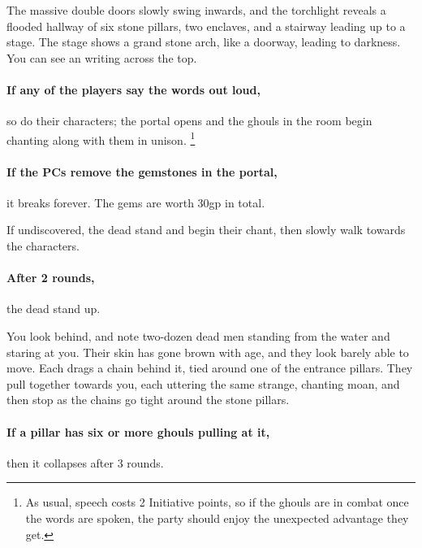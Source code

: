 \begin{multicols}{2}
\begin{boxtext}

  The massive double doors slowly swing inwards, and the torchlight reveals a flooded hallway of six stone pillars, two enclaves, and a stairway leading up to a stage.
  The stage shows a grand stone arch, like a doorway, leading to darkness.
  You can see an writing across the top.

\end{boxtext}

\paragraph{If any of the players say the words out loud,}
so do their characters; the portal opens and the ghouls in the room begin chanting along with them in unison.%
\footnote{As usual, speech costs 2 Initiative points, so if the ghouls are in combat once the words are spoken, the party should enjoy the unexpected advantage they get.}

\paragraph{If the PCs remove the gemstones in the portal,}
it breaks forever.
The gems are worth 30gp in total.

If undiscovered, the dead stand and begin their chant, then slowly walk towards the characters.

\paragraph{After 2 rounds,}
the dead stand up.

\begin{boxtext}

  You look behind, and note two-dozen dead men standing from the water and staring at you.
  Their skin has gone brown with age, and they look barely able to move.
  Each drags a chain behind it, tied around one of the entrance pillars.
  They pull together towards you, each uttering the same strange, chanting moan, and then stop as the chains go tight around the stone pillars.

\end{boxtext}

\paragraph{If a pillar has six or more ghouls pulling at it,}
then it collapses after 3 rounds.


\end{multicols}
